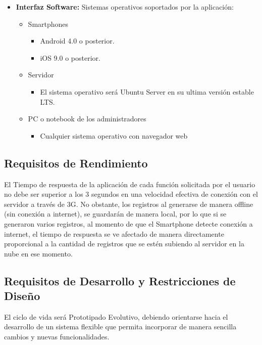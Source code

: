 \begin{itemize}
        \item \textbf{Interfaz Software:} 
          Sistemas operativos soportados por la aplicación:
          \begin{itemize}
            \item Smartphones 
            \begin{itemize}
              \item Android 4.0 o posterior.
              \item iOS 9.0 o posterior.
            \end{itemize}
            \item Servidor 
            \begin{itemize}
              \item  El sistema operativo será Ubuntu Server en su ultima versión estable LTS. 
            \end{itemize}
            \item PC o notebook de los administradores 
            \begin{itemize}
              \item Cualquier sistema operativo con navegador web 
            \end{itemize} 
          \end{itemize}
      \end{itemize}

    \subsection{Requisitos de Rendimiento}

      El Tiempo de respuesta de la aplicación de cada función solicitada por el usuario no debe ser superior a los 3 segundos en una velocidad efectiva de conexión con el servidor a través de 3G.
      No obstante, los registros al generarse de manera offline (sin conexión a internet), se guardarán de manera local, por lo que si se generaron varios registros, al momento de que el Smartphone detecte conexión a internet, el tiempo de respuesta se ve afectado de manera directamente proporcional a la cantidad de registros que se estén subiendo al servidor en la nube en ese momento.

    \subsection{Requisitos de Desarrollo y Restricciones de Diseño}

      El ciclo de vida será Prototipado Evolutivo, debiendo orientarse hacia el desarrollo de un sistema flexible que permita incorporar de manera sencilla cambios y nuevas funcionalidades.

